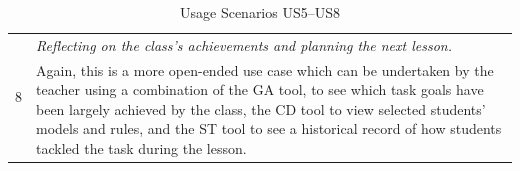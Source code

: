 \begin{table}[htbp]
\begin{tabular}{|p{0.5cm}|p{12.5cm}|}
  \hline \multirow{2}{*}{8}
  & \emph{Reflecting on the class’s achievements and planning the next
  lesson.} \\
  \cline{2-2}
  &  Again, this is a more open-ended use case which can be undertaken by
  the teacher using a combination of the GA tool, to see which task
  goals have been largely achieved by the class, the CD tool to view
  selected students’ models and rules, and the ST tool to see a
  historical record of how students tackled the task during the
  lesson.
   \\
  \hline
  \end{tabular}
  \caption{Usage Scenarios US5--US8}
  \label{tab:djdjsdjk1}
\end{table}
 
 

